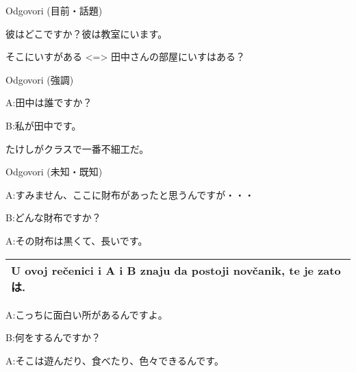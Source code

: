 	\begin{mondai}{Odgovori (目前・話題)}
		\item 彼はどこですか？彼は教室にいます。
		\item そこにいすがある <=> 田中さんの部屋にいすはある？
	\end{mondai}
	
	\newpage
	
	\begin{mondai}{Odgovori (強調)}
		\item 
		A:田中は誰ですか？
		
		B:私が田中です。
		\item たけしがクラスで一番不細工だ。
	\end{mondai}
	
	\begin{mondai}{Odgovori (未知・既知)}
		\item 
		A:すみません、ここに財布があったと思うんですが・・・
		
		B:どんな財布ですか？
		
		A:その財布は黒くて、長いです。
		
		
		\vspace{10pt}
		\begin{tabular}{|l|}
		\hline
		U ovoj rečenici i A i B znaju da postoji novčanik, te je zato は.\\\hline
		\end{tabular}
		\vspace{10pt}		
		
		
		\item 	
		A:こっちに面白い所があるんですよ。
		
		B:何をするんですか？
		
		A:そこは遊んだり、食べたり、色々できるんです。
	\end{mondai}

